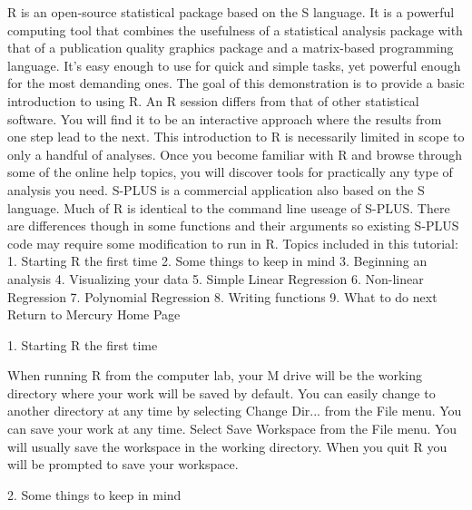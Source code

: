 R is an open-source statistical package based on the S language. It is a powerful computing tool that combines the usefulness of a statistical analysis package with that of a publication quality graphics package and a matrix-based programming language. It's easy enough to use for quick and simple tasks, yet powerful enough for the most demanding ones. The goal of this demonstration is to provide a basic introduction to using R. An R session differs from that of other statistical software. You will find it to be an interactive approach where the results from one step lead to the next. This introduction to R is necessarily limited in scope to only a handful of analyses. Once you become familiar with R and browse through some of the online help topics, you will discover tools for practically any type of analysis you need. S-PLUS is a commercial application also based on the S language. Much of R is identical to the command line useage of S-PLUS. There are differences though in some functions and their arguments so existing S-PLUS code may require some modification to run in R. 
Topics included in this tutorial: 
1. Starting R the first time
2. Some things to keep in mind
3. Beginning an analysis
4. Visualizing your data
5. Simple Linear Regression
6. Non-linear Regression
7. Polynomial Regression
8. Writing functions
9. What to do next 
Return to Mercury Home Page 

1. Starting R the first time


When running R from the computer lab, your M drive will be the working directory where your work will be saved by default. You can easily change to another directory at any time by selecting Change Dir... from the File menu. 
You can save your work at any time. Select Save Workspace from the File menu. You will usually save the workspace in the working directory. When you quit R you will be prompted to save your workspace. 

2. Some things to keep in mind


